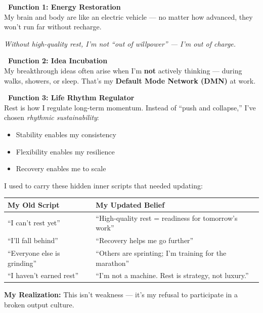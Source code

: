 \documentclass[11pt,a4paper]{article}
\begin{document}
\begin{tcolorbox}[colback=green!5,colframe=green!50,title={Three Key Functions I've Discovered in Real Rest}]
\textbf{\faCheckCircle~Function 1: Energy Restoration}\\
My brain and body are like an electric vehicle — no matter how advanced, they won't run far without recharge.

\begin{center}
\textit{Without high-quality rest, I'm not ``out of willpower'' — I'm out of charge.}
\end{center}

\vspace{0.5em}
\textbf{\faCheckCircle~Function 2: Idea Incubation}\\
My breakthrough ideas often arise when I'm \textbf{not} actively thinking — during walks, showers, or sleep. That's my \textbf{Default Mode Network (DMN)} at work.

\vspace{0.5em}
\textbf{\faCheckCircle~Function 3: Life Rhythm Regulator}\\
Rest is how I regulate long-term momentum. Instead of ``push and collapse,'' I've chosen \textit{rhythmic sustainability}:
\begin{itemize}[leftmargin=1.5em]
    \item Stability enables my consistency
    \item Flexibility enables my resilience
    \item Recovery enables me to scale
\end{itemize}
\end{tcolorbox}

\begin{tcolorbox}[colback=red!5,colframe=red!40,title={The Dangerous Myth I Had to Overcome: ``Rest = Regression''}]
I used to carry these hidden inner scripts that needed updating:

\vspace{0.5em}
\begin{center}
\begin{tabular}{p{5.5cm}|p{6.5cm}}
\toprule
\textbf{My Old Script} & \textbf{My Updated Belief} \\
\midrule
``I can't rest yet'' & ``High-quality rest = readiness for tomorrow's work'' \\
\hline
``I'll fall behind'' & ``Recovery helps me go further'' \\
\hline
``Everyone else is grinding'' & ``Others are sprinting; I'm training for the marathon'' \\
\hline
``I haven't earned rest'' & ``I'm not a machine. Rest is strategy, not luxury.'' \\
\bottomrule
\end{tabular}
\end{center}

\vspace{0.5em}
\textbf{My Realization:} This isn't weakness — it's my refusal to participate in a broken output culture.
\end{tcolorbox}
\end{document}
